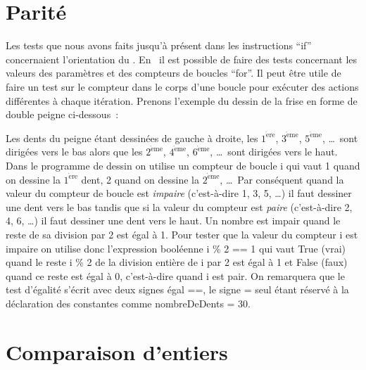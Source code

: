 \section{Parité}
Les tests que nous avons faits jusqu'à présent dans les instructions
``if'' concernaient l'orientation du \robot.  En \python\ il est
possible de faire des tests concernant les valeurs des paramètres et des
compteurs de boucles ``for''.  Il peut être utile de faire un test sur le compteur
dans le corps d'une boucle pour exécuter des actions différentes à
chaque itération.  Prenons l'exemple du dessin de la frise en forme de
double peigne ci-dessous~:

 {\raggedright
   }

Les dents du peigne étant dessinées de gauche à droite, les
$1^{\mathrm{\grave{e}re}}$, $3^{\mathrm{\grave{e}me}}$,
$5^{\mathrm{\grave{e}me}}$, \ldots\ sont dirigées vers le bas alors
que les $2^{\mathrm{\grave{e}me}}$, $4^{\mathrm{\grave{e}me}}$,
$6^{\mathrm{\grave{e}me}}$, \ldots\ sont dirigées vers le haut.  Dans
le programme de dessin on utilise un compteur de boucle {\idt i} qui
vaut 1 quand on dessine la $1^{\mathrm{\grave{e}re}}$ dent, 2 quand on
dessine la $2^{\mathrm{\grave{e}me}}$, \ldots\ Par conséquent quand la
valeur du compteur de boucle est {\em impaire} (c'est-à-dire 1, 3, 5,
\ldots) il faut dessiner une dent vers le bas tandis que si la valeur
du compteur est {\em paire} (c'est-à-dire 2, 4, 6, \ldots) il faut
dessiner une dent vers le haut.  Un nombre est impair
quand le reste de sa division par 2 est égal à 1. Pour tester que la
valeur du compteur {\idt i} est impaire on utilise donc l'expression
booléenne {\idt i \% 2 == 1} qui vaut {\mcl True} (vrai) quand le reste
{\idt i \% 2} de la division entière de {\idt i} par 2 est égal à 1 et
{\mcl False} (faux) quand ce reste est égal à 0, c'est-à-dire quand
{\idt i} est pair.  On remarquera que le test d'égalité s'écrit avec deux
signes égal {\idt ==}, le signe {\idt =} seul étant réservé à la
déclaration des constantes comme {\idt nombreDeDents = 30}.



\section{Comparaison d'entiers}

